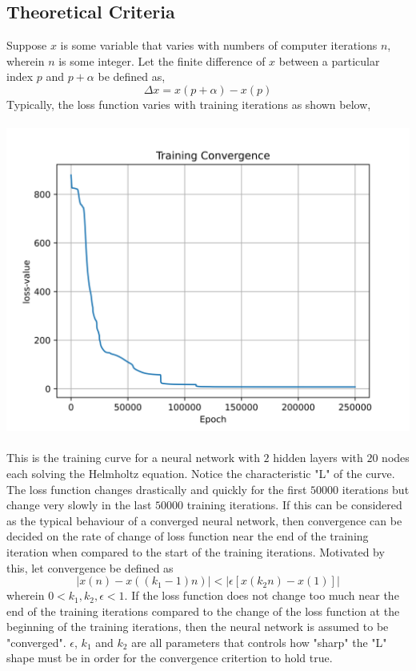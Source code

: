 \documentclass[a4paper, 12pt]{report}
\def\a{\alpha}
\def\sizem{0.93}
\begin{document}
\begin{center}
\subsection{Theoretical Criteria}
Suppose $x$ is some variable that varies with numbers of computer iterations $n$, wherein $n$ is some integer. Let the finite difference of $x$ between a particular index $p$ and $p+\a$ be defined as,
$$\Delta x = x(p+\a) - x(p)$$
Typically, the loss function varies with training iterations as shown below,
\\~\\\includegraphics[scale=\sizem]{Train_Convergence.png}
\\~\\This is the training curve for a neural network with $2$ hidden layers with $20$ nodes each solving the Helmholtz equation. Notice the characteristic "L" of the curve. The loss function changes drastically and quickly for the first $50000$ iterations but change very slowly in the last $50000$ training iterations. If this can be considered as the typical behaviour of a converged neural network, then convergence can be decided on the rate of change of loss function near the end of the training iteration when compared to the start of the training iterations. Motivated by this, let convergence be defined as
$$|x(n) - x((k_1-1)n)| < |\epsilon[x(k_2 n) - x(1)]|$$
wherein $0<k_1,k_2,\epsilon<1$. If the loss function does not change too much near the end of the training iterations compared to the change of the loss function at the beginning of the training iterations, then the neural network is assumed to be "converged". $\epsilon$, $k_1$ and $k_2$ are all parameters that controls how "sharp" the "L" shape must be in order for the convergence critertion to hold true. 

\end{center}
\end{document}
